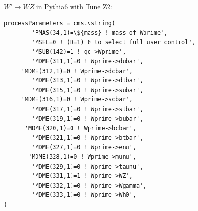 $W' \to WZ$ in Pythia6 with Tune Z2:
\begin{verbatim}
processParameters = cms.vstring(
        'PMAS(34,1)=\${mass} ! mass of Wprime',
        'MSEL=0 ! (D=1) 0 to select full user control',
        'MSUB(142)=1 ! qq->Wprime',
        'MDME(311,1)=0 ! Wprime->dubar',   
     'MDME(312,1)=0 ! Wprime->dcbar',
        'MDME(313,1)=0 ! Wprime->dtbar',
        'MDME(315,1)=0 ! Wprime->subar',       
	 'MDME(316,1)=0 ! Wprime->scbar',
        'MDME(317,1)=0 ! Wprime->stbar',
        'MDME(319,1)=0 ! Wprime->bubar',      
	  'MDME(320,1)=0 ! Wprime->bcbar',
        'MDME(321,1)=0 ! Wprime->btbar',
        'MDME(327,1)=0 ! Wprime->enu',     
	   'MDME(328,1)=0 ! Wprime->munu',
        'MDME(329,1)=0 ! Wprime->taunu',
        'MDME(331,1)=1 ! Wprime->WZ',
        'MDME(332,1)=0 ! Wprime->Wgamma',
        'MDME(333,1)=0 ! Wprime->Wh0',
)
\end{verbatim}






\clearpage

